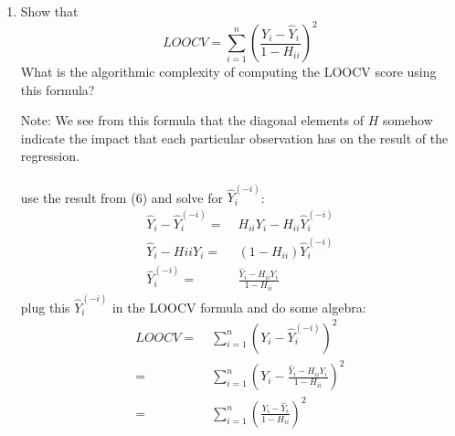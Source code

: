 \begin{enumerate}
 {\bf Ans: }
\begin{align*}
	\hat{Y}_i - \hat{Y}_i^{(-i)} =&\; \sum_{J=1}^{m}H_{ij}Y_j - \sum_{j=1}^m 		H{ij}Z_j\\
	=&\; \sum_{J=1}^{m}H_{ij}Y_j - (\sum_{j=1}^m H_{ij}Y_j - H_{ii}Y_i + H_{ii}\hat{Y}_i^{(-i)}\\
	=&\; H_{ii}Y_i - H_{ii}\hat{Y}_i^{(-i)}
\end{align*}



\item 
Show that
\[
LOOCV = \sum_{i=1}^{n}  \left(\frac{Y_i - \hat{Y}_i}{1-H_{ii}}\right)^2
\]
What is the algorithmic complexity of computing the LOOCV score using
this formula?

Note: We see from this formula that the diagonal elements of $H$ somehow
indicate the impact that each particular observation has on the result
of the regression.\\
\\
use the result from (6) and solve for $\hat{Y}_i^{(-i)}$:
\begin{align*}
\hat{Y}_i - \hat{Y}_i^{(-i)} =&\; H_{ii}Y_i - H_{ii}\hat{Y}_i^{(-i)}\\
\hat{Y}_i - H{ii}Y_i =&\; (1-H_{ii})\hat{Y}_i^{(-i)}\\
\hat{Y}_i^{(-i)}=&\; \frac{\hat{Y}_i-H_{ii}Y_i}{1-H_{ii}}
\end{align*}
plug this $\hat{Y}_i^{(-i)}$ in the LOOCV formula and do some algebra:
\begin{align*}
LOOCV =&\; \sum_{i=1}^{n}  \left(Y_i - \hat{Y}_i^{(-i)}\right)^2\\
=&\; \sum_{i=1}^{n}  \left(Y_i - \frac{\hat{Y}_i-H_{ii}Y_i}{1-H_{ii}}\right)^2\\
=&\; \sum_{i=1}^{n}  \left(\frac{Y_i - \hat{Y}_i}{1-H_{ii}}\right)^2
\end{align*}
\end{enumerate}

